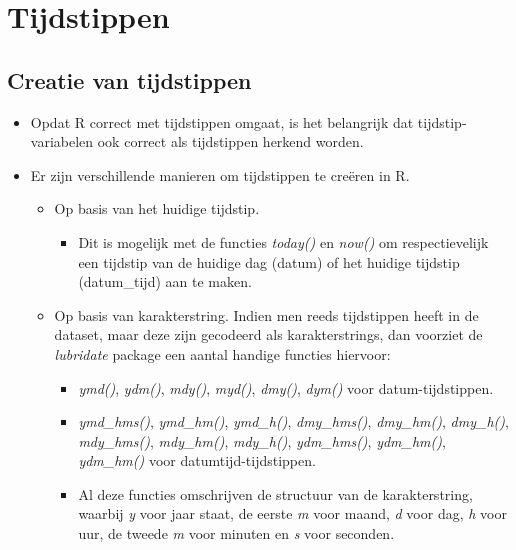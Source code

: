 \documentclass[]{memoir}
\providecommand{\tightlist}{%
  \setlength{\itemsep}{0pt}\setlength{\parskip}{0pt}}
\begin{document}
\section{Tijdstippen}\label{tijdstippen}

\subsection{Creatie van tijdstippen}\label{creatie-van-tijdstippen}

\begin{itemize}
\tightlist
\item
  Opdat R correct met tijdstippen omgaat, is het belangrijk dat
  tijdstip-variabelen ook correct als tijdstippen herkend worden.
\item
  Er zijn verschillende manieren om tijdstippen te creëren in R.

  \begin{itemize}
  \tightlist
  \item
    Op basis van het huidige tijdstip.

    \begin{itemize}
    \tightlist
    \item
      Dit is mogelijk met de functies \emph{today()} en \emph{now()} om
      respectievelijk een tijdstip van de huidige dag (datum) of het
      huidige tijdstip (datum\_tijd) aan te maken.
    \end{itemize}
  \item
    Op basis van karakterstring. Indien men reeds tijdstippen heeft in
    de dataset, maar deze zijn gecodeerd als karakterstrings, dan
    voorziet de \emph{lubridate} package een aantal handige functies
    hiervoor:

    \begin{itemize}
    \tightlist
    \item
      \emph{ymd()}, \emph{ydm()}, \emph{mdy()}, \emph{myd()},
      \emph{dmy()}, \emph{dym()} voor datum-tijdstippen.
    \item
      \emph{ymd\_hms()}, \emph{ymd\_hm()}, \emph{ymd\_h()},
      \emph{dmy\_hms()}, \emph{dmy\_hm()}, \emph{dmy\_h()},
      \emph{mdy\_hms()}, \emph{mdy\_hm()}, \emph{mdy\_h()},
      \emph{ydm\_hms()}, \emph{ydm\_hm()}, \emph{ydm\_hm()} voor
      datumtijd-tijdstippen.
    \item
      Al deze functies omschrijven de structuur van de karakterstring,
      waarbij \emph{y} voor jaar staat, de eerste \emph{m} voor maand,
      \emph{d} voor dag, \emph{h} voor uur, de tweede \emph{m} voor
      minuten en \emph{s} voor seconden.


\end{itemize}
\end{itemize}
\end{itemize}
\end{document}
